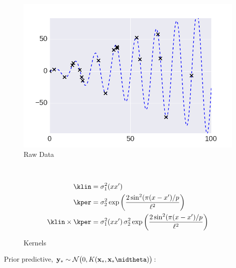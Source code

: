  \centering

     \begin{subfigure}[b]{0.3\textwidth}
        \includegraphics[width=\textwidth]{figs/composition/composition_demo_raw_data.png}
        \caption{Raw Data}
    \end{subfigure}
    ~ %
    \begin{subfigure}[b]{0.55\textwidth}
\small
     \begin{align*}
        \klin &=   \sigma_1^2(x x^\prime)\\
    \kper &=  \sigma_2^2 \exp \bigg( \frac{2 \sin^2 ( \pi (x -
x^\prime)/p}{\ell^2} \bigg)\\ 
    \klin \times \kper &=  \sigma_1^2(x x^\prime)\, \sigma_2^2 \exp \bigg( \frac{2 \sin^2 ( \pi (x - x^\prime)/p}{\ell^2} \bigg) 
    \end{align*}\vspace{0mm} 
        \caption{Kernels}
    \end{subfigure}\vspace{4mm} 




Prior predictive, $\ybf_* \sim \mathcal{N}\big(0,K(\xbf_*,\xbf_* \midtheta)\big)$:

